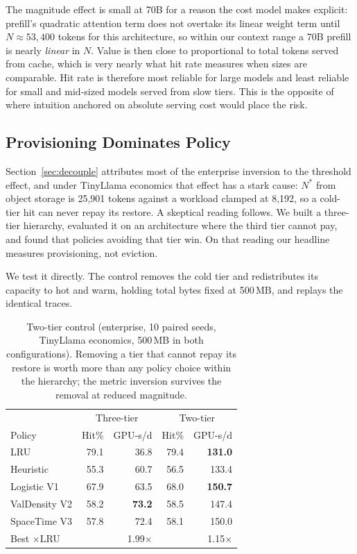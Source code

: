 \documentclass[letterpaper,twocolumn,10pt]{article}
\begin{document}
The magnitude effect is small at 70B for a reason the cost model makes explicit: prefill's quadratic attention term does not overtake its linear weight term until $N{\approx}53{,}400$ tokens for this architecture, so within our context range a 70B prefill is nearly \emph{linear} in $N$. Value is then close to proportional to total tokens served from cache, which is very nearly what hit rate measures when sizes are comparable. Hit rate is therefore most reliable for large models and least reliable for small and mid-sized models served from slow tiers. This is the opposite of where intuition anchored on absolute serving cost would place the risk.

\subsection{Provisioning Dominates Policy}
\label{sec:twotier}

Section~\ref{sec:decouple} attributes most of the enterprise inversion to the threshold
effect, and under TinyLlama economics that effect has a stark cause: $N^{*}$ from object
storage is 25,901 tokens against a workload clamped at 8,192, so a cold-tier hit can never
repay its restore. A skeptical reading follows. We built a three-tier hierarchy, evaluated
it on an architecture where the third tier cannot pay, and found that policies avoiding
that tier win. On that reading our headline measures provisioning, not eviction.

We test it directly. The control removes the cold tier and redistributes its capacity to
hot and warm, holding total bytes fixed at 500\,MB, and replays the identical traces.

\begin{table}[t]
\centering
\caption{Two-tier control (enterprise, 10 paired seeds, TinyLlama economics, 500\,MB in both
configurations). Removing a tier that cannot repay its restore is worth more than any policy
choice within the hierarchy; the metric inversion survives the removal at reduced magnitude.}
\label{tab:twotier}
\footnotesize
\setlength{\tabcolsep}{2pt}
\begin{tabular}{@{}lrrrr@{}}
\toprule
 & \multicolumn{2}{c}{Three-tier} & \multicolumn{2}{c}{Two-tier} \\
Policy & Hit\% & GPU-s/d & Hit\% & GPU-s/d \\
\midrule
LRU           & 79.1 & 36.8 & 79.4 & \textbf{131.0} \\
Heuristic     & 55.3 & 60.7 & 56.5 & 133.4 \\
Logistic V1   & 67.9 & 63.5 & 68.0 & \textbf{150.7} \\
ValDensity V2 & 58.2 & \textbf{73.2} & 58.5 & 147.4 \\
SpaceTime V3  & 57.8 & 72.4 & 58.1 & 150.0 \\
\midrule
Best $\times$LRU & & 1.99$\times$ & & 1.15$\times$ \\
\bottomrule
\end{tabular}
\end{table}
\end{document}
